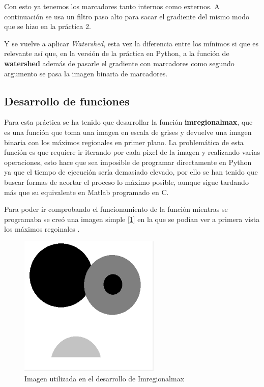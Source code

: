 \documentclass[a4paper,12pt]{report}
\begin{document}
Con esto ya tenemos los marcadores tanto internos como externos. A continuación se usa un filtro paso alto para sacar el gradiente del mismo modo que se hizo en la práctica 2. 

Y se vuelve a aplicar  \emph{Watershed}, esta vez la diferencia entre los mínimos si que es relevante así que, en la versión de la práctica en Python, a la función de \textbf{watershed} además de pasarle el gradiente con marcadores como segundo argumento se pasa la imagen binaria de marcadores.\\


\subsection{Desarrollo de funciones}

Para esta práctica se ha tenido que desarrollar la función \textbf{imregionalmax}, que es una función que toma una imagen en escala de grises y devuelve una imagen binaria con los máximos regionales en primer plano. La problemática de esta función es que requiere ir iterando por cada pixel de la imagen y realizando varias operaciones, esto hace que sea imposible de programar directamente en Python ya que el tiempo de ejecución sería demasiado elevado, por ello se han tenido que buscar formas de acortar el proceso lo máximo posible, aunque sigue tardando más que su equivalente en Matlab programado en C.

Para poder ir comprobando el funcionamiento de la función mientras se programaba se creó una imagen simple [\ref{minimos}] en la que se podían ver a primera vista los máximos regoinales .\\


\begin{figure}[h]
\centering
\includegraphics[width=0.6\textwidth]{imagenes/minimos}
\caption{Imagen utilizada en el desarrollo de Imregionalmax}
\label{minimos} 
\end{figure}
\end{document}

